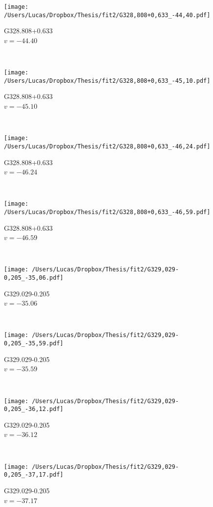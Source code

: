\begin{figure*}[t]\ContinuedFloat
	\centering
	\begin{subfigure}[t]{0.3\textwidth}
		\texttt{[image: /Users/Lucas/Dropbox/Thesis/fit2/G328,808+0,633\_-44,40.pdf]}
		\caption[]{G328.808+0.633\\$v=-44.40$\,\kms}
	\end{subfigure}
	~
	\begin{subfigure}[t]{0.3\textwidth}
		\texttt{[image: /Users/Lucas/Dropbox/Thesis/fit2/G328,808+0,633\_-45,10.pdf]}
		\caption[]{G328.808+0.633\\$v=-45.10$\,\kms}
	\end{subfigure}
	~
	\begin{subfigure}[t]{0.3\textwidth}
		\texttt{[image: /Users/Lucas/Dropbox/Thesis/fit2/G328,808+0,633\_-46,24.pdf]}
		\caption[]{G328.808+0.633\\$v=-46.24$\,\kms}
	\end{subfigure}
	~
	\begin{subfigure}[t]{0.3\textwidth}
		\texttt{[image: /Users/Lucas/Dropbox/Thesis/fit2/G328,808+0,633\_-46,59.pdf]}
		\caption[]{G328.808+0.633\\$v=-46.59$\,\kms}
	\end{subfigure}
	~
	\begin{subfigure}[t]{0.3\textwidth}
		\texttt{[image: /Users/Lucas/Dropbox/Thesis/fit2/G329,029-0,205\_-35,06.pdf]}
		\caption[]{G329.029-0.205\\$v=-35.06$\,\kms}
	\end{subfigure}
	~
	\begin{subfigure}[t]{0.3\textwidth}
		\texttt{[image: /Users/Lucas/Dropbox/Thesis/fit2/G329,029-0,205\_-35,59.pdf]}
		\caption[]{G329.029-0.205\\$v=-35.59$\,\kms}
	\end{subfigure}
	~
	\begin{subfigure}[t]{0.3\textwidth}
		\texttt{[image: /Users/Lucas/Dropbox/Thesis/fit2/G329,029-0,205\_-36,12.pdf]}
		\caption[]{G329.029-0.205\\$v=-36.12$\,\kms}
	\end{subfigure}
	~
	\begin{subfigure}[t]{0.3\textwidth}
		\texttt{[image: /Users/Lucas/Dropbox/Thesis/fit2/G329,029-0,205\_-37,17.pdf]}
		\caption[]{G329.029-0.205\\$v=-37.17$\,\kms}

\end{subfigure}
\end{figure*}

